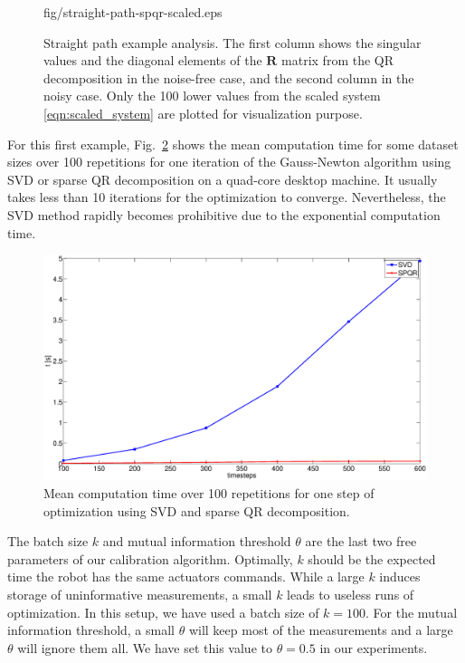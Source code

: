 \begin{figure}[t]
\begin{minipage}{.492\columnwidth}
    {fig/straight-path-spqr-scaled.eps}
\end{minipage}
\caption{Straight path example analysis. The first column shows the singular
  values and the diagonal elements of the $\mathbf{R}$ matrix from the QR
  decomposition in the noise-free case, and the second column in the noisy
  case. Only the 100 lower values from the scaled system
  \eqref{eqn:scaled_system} are plotted for visualization purpose.}
\label{fig:straight-path-analysis}
\end{figure}

For this first example, Fig.~\ref{fig:straight-path-time} shows the mean
computation time for some dataset sizes over 100 repetitions for one iteration
of the Gauss-Newton algorithm using SVD or sparse QR decomposition on a
quad-core desktop machine. It usually takes less than 10 iterations for the
optimization to converge. Nevertheless, the SVD method rapidly becomes
prohibitive due to the exponential computation time.

\begin{figure}[t]
\centering
\includegraphics[width=\columnwidth]{fig/straight-path-time.eps}
\caption{Mean computation time over 100 repetitions for one step of
  optimization using SVD and sparse QR decomposition.}
\label{fig:straight-path-time}
\end{figure}

The batch size $k$ and mutual information threshold $\theta$ are the last two
free parameters of our calibration algorithm. Optimally, $k$ should be the
expected time the robot has the same actuators commands. While a large $k$
induces storage of uninformative measurements, a small $k$ leads to useless
runs of optimization. In this setup, we have used a batch size of $k=100$. For
the mutual information threshold, a small $\theta$ will keep most of the
measurements and a large $\theta$ will ignore them all. We have set this value
to $\theta=0.5$ in our experiments.

